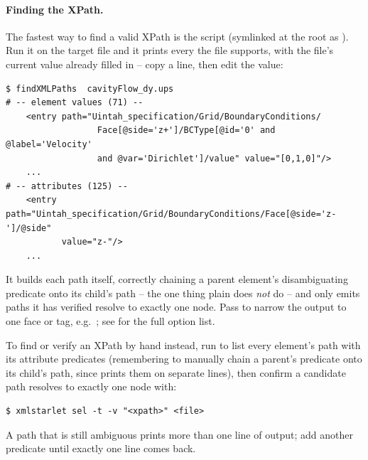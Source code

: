 \paragraph{Finding the XPath.} The fastest way to find a valid XPath is the
 script (symlinked at the  root as ). Run
it on the target  file and it prints every  the
file supports, with the file's current value already filled in -- copy a line, then edit the value:

{\footnotesize
\begin{verbatim}
$ findXMLPaths  cavityFlow_dy.ups
# -- element values (71) --
    <entry path="Uintah_specification/Grid/BoundaryConditions/
                  Face[@side='z+']/BCType[@id='0' and @label='Velocity'
                  and @var='Dirichlet']/value" value="[0,1,0]"/>
    ...
# -- attributes (125) --
    <entry path="Uintah_specification/Grid/BoundaryConditions/Face[@side='z-']/@side"
           value="z-"/>
    ...
\end{verbatim}
}

It builds each path itself, correctly chaining a parent element's disambiguating predicate onto its
child's path -- the one thing plain  does \emph{not} do -- and only emits paths
it has verified resolve to exactly one node. Pass  to narrow the output to
one face or tag, e.g.\ ; see  for the
full option list.

To find or verify an XPath by hand instead, run  to list every
element's path with its attribute predicates (remembering to manually chain a parent's predicate
onto its child's path, since  prints them on separate lines), then confirm a candidate
path resolves to exactly one node with:

{\footnotesize
\begin{verbatim}
$ xmlstarlet sel -t -v "<xpath>" <file>
\end{verbatim}
}

A path that is still ambiguous prints more than one line of output; add another predicate until
exactly one line comes back.

\subsection{}
\label{Sec:PS-PreProcessCmd}

